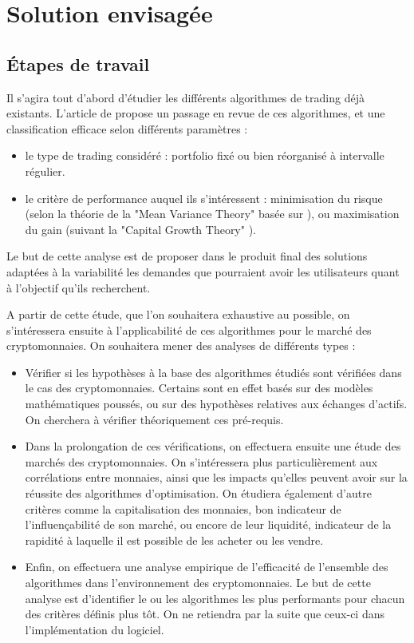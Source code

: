 \documentclass[a4paper]{article}
\begin{document}
\section{Solution envisagée}

\subsection{Étapes de travail}

Il s'agira tout d'abord d'étudier les différents algorithmes de trading déjà existants. L'article de \citet{Li2014} propose un passage en revue de ces algorithmes, et une classification efficace selon différents paramètres :
\begin{itemize}
    \item le type de trading considéré : portfolio fixé ou bien réorganisé à intervalle régulier.
    \item le critère de performance auquel ils s'intéressent : minimisation du risque (selon la théorie de la "Mean Variance Theory" basée sur \citet{Markovitz1952}), ou maximisation du gain (suivant la "Capital Growth Theory" \cite{Hakansson2011}).
\end{itemize}
Le but de cette analyse est de proposer dans le produit final des solutions adaptées à la variabilité les demandes que pourraient avoir les utilisateurs quant à l'objectif qu'ils recherchent.

A partir de cette étude, que l'on souhaitera exhaustive au possible, on s'intéressera ensuite à l'applicabilité de ces algorithmes pour le marché des cryptomonnaies. On souhaitera mener des analyses de différents types :
\begin{itemize}
    \item Vérifier si les hypothèses à la base des algorithmes étudiés sont vérifiées dans le cas des cryptomonnaies. Certains sont en effet basés sur des modèles mathématiques poussés, ou sur des hypothèses relatives aux échanges d'actifs. On cherchera à vérifier théoriquement ces pré-requis.
    \item Dans la prolongation de ces vérifications, on effectuera ensuite une étude des marchés des cryptomonnaies. On s'intéressera plus particulièrement aux corrélations entre monnaies, ainsi que les impacts qu'elles peuvent avoir sur la réussite des algorithmes d'optimisation. On étudiera également d'autre critères comme la capitalisation des monnaies, bon indicateur de l'influençabilité de son marché, ou encore de leur liquidité, indicateur de la rapidité à laquelle il est possible de les acheter ou les vendre.
    \item Enfin, on effectuera une analyse empirique de l'efficacité de l'ensemble des algorithmes dans l'environnement des cryptomonnaies. Le but de cette analyse est d'identifier le ou les algorithmes les plus performants pour chacun des critères définis plus tôt. On ne retiendra par la suite que ceux-ci dans l'implémentation du logiciel.
\end{itemize}\medskip
\end{document}
